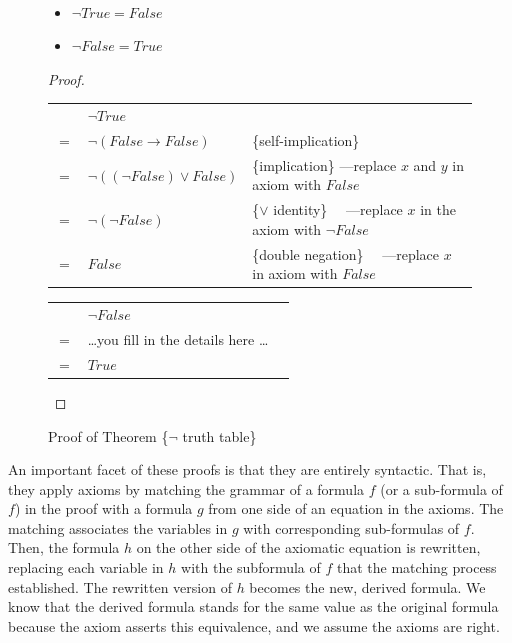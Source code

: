 \begin{figure}
\begin{theorem}
\mbox{}\\
\begin{itemize}
\item $\neg True = False$
\item $\neg False = True$
\end{itemize}
\end{theorem}
\begin{proof}
\mbox{} \\
\begin{tabular}{llp{3.15in}}
    & $\neg True$                      & \\
$=$ & $\neg (False \rightarrow False)$ & \{self-implication\} \\
$=$ & $\neg ((\neg False) \vee False)$ & \{implication\}     ---replace $x$ and $y$ in axiom with $False$ \\
$=$ & $\neg (\neg False)$              & \{$\vee$ identity\} ~~---replace $x$ in the axiom with $\neg False$ \\
$=$ & $False$                          & \{double negation\} ~~---replace $x$ in axiom with $False$ \\
\end{tabular}

\bigskip
\noindent
\begin{tabular}{lll}
    & $\neg False$                             & \\
$=$ & \dots you fill in the details here \dots & \\
$=$ & $True$                                   & \\
\end{tabular}

\end{proof}
\caption{Proof of Theorem \{$\neg$ truth table\}}
\label{fig:neg-truth-table}
\end{figure}

An important facet of these proofs is that they are
entirely syntactic. That is, they apply axioms by
matching the grammar of a formula $f$ (or a sub-formula of $f$) in the proof
with a formula $g$ from one side of an equation in the axioms.
The matching associates the variables in $g$ with corresponding sub-formulas of $f$.
Then, the formula $h$ on the other side of
the axiomatic equation is rewritten,
replacing each variable in $h$ with the subformula of $f$
that the matching process established.
The rewritten version of $h$
becomes the new, derived formula.
We know that the derived formula stands for the same value
as the original formula because the axiom asserts this equivalence,
and we assume the axioms are right.


